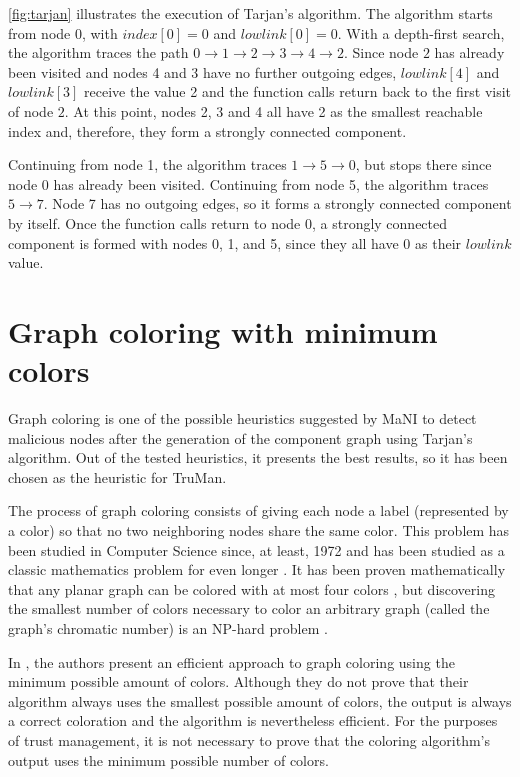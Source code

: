 \autoref{fig:tarjan} illustrates the execution of Tarjan's algorithm.
The algorithm starts from node 0, with $index[0] = 0$ and $lowlink[0] = 0$.
With a depth-first search, the algorithm traces the path $0 \rightarrow 1 \rightarrow 2 \rightarrow 3 
\rightarrow 4 \rightarrow 2$.
Since node $2$ has already been visited and nodes 4 and 3 have no further outgoing edges, $lowlink[4]$ and $lowlink[3]$ receive the value 2 and the function calls return back to the first visit of node $2$.
At this point, nodes 2, 3 and 4 all have 2 as the smallest reachable index and, therefore, they form a strongly connected component.

Continuing from node 1, the algorithm traces $1 \rightarrow 5 \rightarrow 0$, but stops there since node 0 has already been visited.
Continuing from node 5, the algorithm traces $5 \rightarrow 7$.
Node 7 has no outgoing edges, so it forms a strongly connected component by itself.
Once the function calls return to node 0, a strongly connected component is formed with nodes 0, 1, and 5, since they all have 0 as their $lowlink$ value.

\section{Graph coloring with minimum colors}
\label{section:coloring}
Graph coloring is one of the possible heuristics suggested by MaNI to detect malicious nodes after the generation of the component graph using Tarjan's algorithm.
Out of the tested heuristics, it presents the best results, so it has been chosen as the heuristic for TruMan.

The process of graph coloring consists of giving each node a label (represented by a color) so that no two neighboring nodes share the same color.
This problem has been studied in Computer Science since, at least, 1972 \citep{karp1972reducibility} and has been studied as a classic mathematics problem for even longer \citep{kempe1879geographical}.
It has been proven mathematically that any planar graph can be colored with at most four colors \citep{appel1976every}, but discovering the smallest number of colors necessary to color an arbitrary graph (called the graph's chromatic number) is an NP-hard problem \citep{sanchez1989determining}.

In \citep{mittal2011graph}, the authors present an efficient approach to graph coloring using the minimum possible amount of colors.
Although they do not prove that their algorithm always uses the smallest possible amount of colors, the output is always a correct coloration and the algorithm is nevertheless efficient.
For the purposes of trust management, it is not necessary to prove that the coloring algorithm's output uses the minimum possible number of colors.


